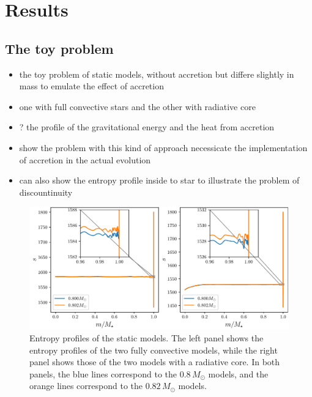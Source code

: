 \documentclass[12pt,a4paper]{article}
\newcommand{\mr}{\mathrm}
\newenvironment{outline}[1]{%
  \begin{itemize}[label=\textbullet]%
  \color{#1}%
}{%
  \end{itemize}%
}
\begin{document}


\section{Results}
\label{sec:results}

\subsection{The toy problem}
\label{sec:toy_problem}
\begin{outline}{gray}
  \item the toy problem of static models, without accretion but differe slightly in mass to emulate the effect of accretion
  \item one with full convective stars and the other with radiative core
  \item ? the profile of the gravitational energy and the heat from accretion
  \item show the problem with this kind of approach necessicate the implementation of accretion in the actual evolution 
  \item can also show the entropy profile inside to star to illustrate the problem of discountinuity
\end{outline}

\begin{figure}
  \centering  
  \includegraphics[width=\textwidth,keepaspectratio]{toy_problem_entropy.pdf}
  \caption{Entropy profiles of the static models. The left panel shows the entropy profiles of the two fully convective models, while the right panel shows those of the two models with a radiative core. In both panels, the blue lines correspond to the $0.8\,M_\odot$ models, and the orange lines correspond to the $0.82\,M_\odot$ models.} \label{fig:toy_problem_entropy}
\end{figure}
\end{document}
